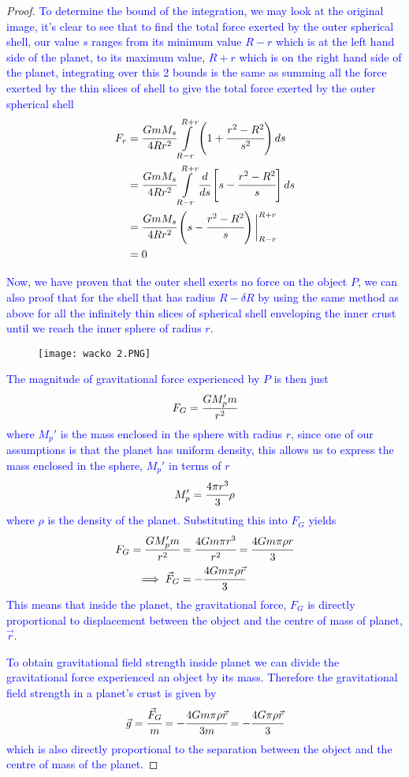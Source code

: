 \documentclass{article}
\begin{document}
\begin{proof}
\textcolor{blue}{To determine the bound of the integration, we may look at the original image, it's clear to see that to find the total force exerted by the outer spherical shell, our value $s$ ranges from its minimum value $R-r$ which is at the left hand side of the planet, to its maximum value, $R+r$ which is on the right hand side of the planet, integrating over this 2 bounds is the same as summing all the force exerted by the thin slices of shell to give the total force exerted by the outer spherical shell 
\begin{align*}
    F_r& = \cfrac{GmM_s}{4Rr^2} \int \limits_{R-r}^{R+r} \left(1+\cfrac{r^2-R^2}{s^2}\right) ds \\ 
        &= \cfrac{GmM_s}{4Rr^2} \int \limits_{R-r}^{R+r} \cfrac{d}{ds}\left[s-\cfrac{r^2-R^2}{s}\right]ds \\ 
        &= \cfrac{GmM_s}{4Rr^2} \left(s-\cfrac{r^2-R^2}{s}\right) \bigg|_{R-r}^{R+r} \\ 
        &= 0
\end{align*}}

\textcolor{blue}{Now, we have proven that the outer shell exerts no force on the object $P$, we can also proof that for the shell that has radius $R-\delta R$ by using the same method as above for all the infinitely thin slices of spherical shell enveloping the inner crust until we reach the inner sphere of radius $r$. }
\begin{figure}[H]
    \centering
    \texttt{[image: wacko 2.PNG]}
\end{figure}

\textcolor{blue}{The magnitude of gravitational force experienced by $P$ is then just 
$$F_G=\cfrac{GM_p'm}{r^2}$$
where $M_p'$ is the mass enclosed in the sphere with radius $r$, since one of our assumptions is that the planet has uniform density, this allows us to express the mass enclosed in the sphere, $M_p'$ in terms of $r$ 
$$M_p'=\cfrac{4\pi r^3}{3}\rho$$
where $\rho$ is the density of the planet. Substituting this into $F_G$ yields
\begin{align*}
    F_G=\cfrac{GM_p'm}{r^2}&=\cfrac{4Gm\pi r^3}{r^2}=\cfrac{4Gm\pi\rho r}{3} \\ 
    \implies \vec{F}_G&=-\cfrac{4Gm\pi\rho \vec{r}}{3}
\end{align*}
This means that inside the planet, the gravitational force, $F_G$ is directly proportional to displacement between the object and the centre of mass of planet, $\vec{r}$.}

\textcolor{blue}{To obtain gravitational field strength inside planet we can divide the gravitational force experienced an object by its mass. Therefore the gravitational field strength in a planet's crust is given by 
$$\vec{g}=\cfrac{\vec{F}_G}{m}=-\cfrac{4Gm\pi\rho \vec{r}}{3m}=-\cfrac{4G\pi\rho \vec{r}}{3}$$
which is also directly proportional to the separation between the object and the centre of mass of the planet.}


\end{proof}
\end{document}
